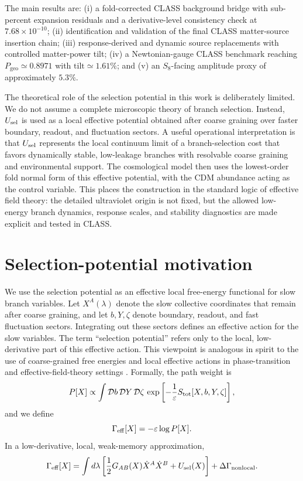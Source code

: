 ﻿\documentclass[11pt,prd,preprint,nofootinbib,amsmath,amssymb]{revtex4-2}
\begin{document}
The main results are:
(i) a fold-corrected CLASS background bridge with sub-percent expansion
residuals and a derivative-level consistency check at
$7.68\times10^{-10}$;
(ii) identification and validation of the final CLASS matter-source insertion
chain;
(iii) response-derived and dynamic source replacements with controlled
matter-power tilt;
(iv) a Newtonian-gauge CLASS benchmark reaching
$P_{\mathrm{geo}}\simeq0.8971$ with $\mathrm{tilt}\simeq1.61\%$;
and (v) an $S_8$-facing amplitude proxy of approximately $5.3\%$.

The theoretical role of the selection potential in this work is deliberately
limited. We do not assume a complete microscopic theory of branch selection.
Instead, $U_{\rm sel}$ is used as a local effective potential obtained after
coarse graining over faster boundary, readout, and fluctuation sectors. A
useful operational interpretation is that $U_{\rm sel}$ represents the local
continuum limit of a branch-selection cost that favors dynamically stable,
low-leakage branches with resolvable coarse graining and environmental support.
The cosmological model then
uses the lowest-order fold normal form of this effective potential, with the
CDM abundance acting as the control variable. This places the construction in
the standard logic of effective field theory: the detailed ultraviolet origin
is not fixed, but the allowed low-energy branch dynamics, response scales, and
stability diagnostics are made explicit and tested in CLASS.

\section{Selection-potential motivation}
\label{sec:selection_potential}

We use the selection potential as an effective local free-energy functional
for slow branch variables. Let $X^A(\lambda)$ denote the slow collective
coordinates that remain after coarse graining, and let $b,Y,\zeta$ denote
boundary, readout, and fast fluctuation sectors. Integrating out these sectors
defines an effective action for the slow variables. The term ``selection
potential'' refers only to the local, low-derivative part of this effective
action. This viewpoint is analogous in spirit to the use of coarse-grained
free energies and local effective actions in phase-transition and
effective-field-theory settings
\cite{Wilson1971,WeinbergEFT,LandauLifshitzStat,ArnoldCatastrophe}.
Formally, the path weight is
\begin{equation}
P[X]\propto
\int \mathcal D b\,\mathcal D Y\,\mathcal D\zeta\,
\exp\left[
-\frac{1}{\varepsilon}S_{\rm tot}[X,b,Y,\zeta]
\right],
\end{equation}
and we define
\begin{equation}
\Gamma_{\rm eff}[X]
=
-\varepsilon\log P[X].
\end{equation}
In a low-derivative, local, weak-memory approximation,
\begin{equation}
\Gamma_{\rm eff}[X]
=
\int d\lambda
\left[
\frac12G_{AB}(X)\dot X^A\dot X^B
+
U_{\rm sel}(X)
\right]
+
\Delta\Gamma_{\rm nonlocal}.
\end{equation}
\end{document}

